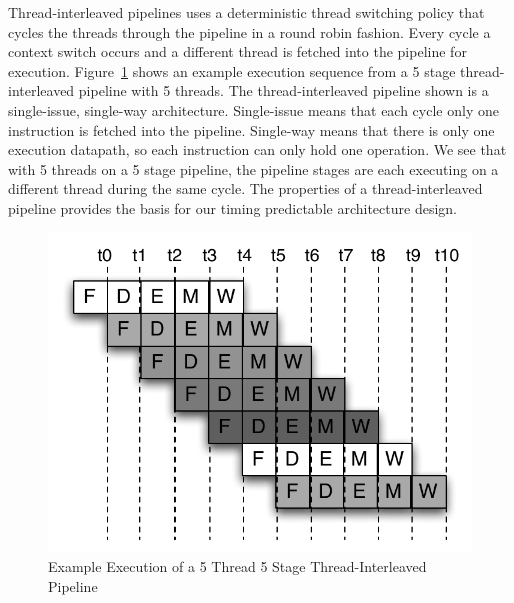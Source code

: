 Thread-interleaved pipelines uses a deterministic thread switching policy that cycles the threads through the pipeline in a round robin fashion.
Every cycle a context switch occurs and a different thread is fetched into the pipeline for execution. 
Figure~\ref{fig:execution_thread_interleaved_pipeline} shows an example execution sequence from a 5 stage thread-interleaved pipeline with 5 threads.
The thread-interleaved pipeline shown is a single-issue, single-way architecture.
Single-issue means that each cycle only one instruction is fetched into the pipeline.
Single-way means that there is only one execution datapath, so each instruction can only hold one operation.
We see that with 5 threads on a 5 stage pipeline, the pipeline stages are each executing on a different thread during the same cycle.
The properties of a thread-interleaved pipeline provides the basis for our timing predictable architecture design.
\begin{figure}
  \begin{center}
    \includegraphics[scale=.65]{figs/thread-interleaved-execution}
  \end{center}
  \vspace{-20pt}
  \caption{Example Execution of a 5 Thread 5 Stage Thread-Interleaved Pipeline}
  \label{fig:execution_thread_interleaved_pipeline}
\end{figure}


